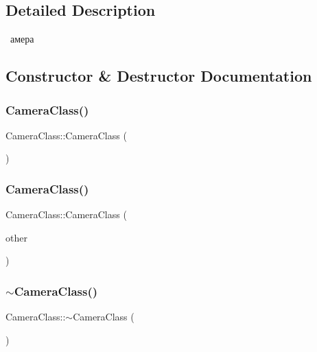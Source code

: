 \subsection{Detailed Description}
 амера 

\subsection{Constructor \& Destructor Documentation}
\mbox{\label{class_camera_class_aafa301844b0e5e6cfb84eb718e5a8cb7}} 
\subsubsection{\texorpdfstring{Camera\+Class()}{CameraClass()}\hspace{0.1cm}{\footnotesize\ttfamily [1/2]}}
{\footnotesize\ttfamily Camera\+Class\+::\+Camera\+Class (\begin{DoxyParamCaption}{ }\end{DoxyParamCaption})}

\mbox{\label{class_camera_class_a297352fa77e8e6ceeb2c0825c71b67a5}} 
\subsubsection{\texorpdfstring{Camera\+Class()}{CameraClass()}\hspace{0.1cm}{\footnotesize\ttfamily [2/2]}}
{\footnotesize\ttfamily Camera\+Class\+::\+Camera\+Class (\begin{DoxyParamCaption}\item[{const \hyperlink{class_camera_class}{Camera\+Class} \&}]{other }\end{DoxyParamCaption})}

\mbox{\label{class_camera_class_a76d3bae304d885a19839ea93ba3c582d}} 
\subsubsection{\texorpdfstring{$\sim$\+Camera\+Class()}{~CameraClass()}}
{\footnotesize\ttfamily Camera\+Class\+::$\sim$\+Camera\+Class (\begin{DoxyParamCaption}{ }\end{DoxyParamCaption})}



